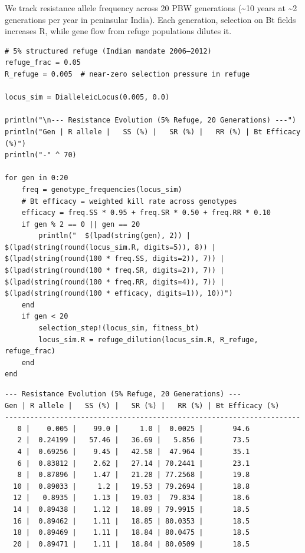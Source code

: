 \label{10169805131403377556}{}


We track resistance allele frequency across 20 PBW generations ({\textasciitilde}10 years at {\textasciitilde}2 generations per year in peninsular India). Each generation, selection on Bt fields increases R, while gene flow from refuge populations dilutes it.




\begin{verbatim}
# 5% structured refuge (Indian mandate 2006–2012)
refuge_frac = 0.05
R_refuge = 0.005  # near-zero selection pressure in refuge

locus_sim = DialleleicLocus(0.005, 0.0)

println("\n--- Resistance Evolution (5% Refuge, 20 Generations) ---")
println("Gen | R allele |   SS (%) |   SR (%) |   RR (%) | Bt Efficacy (%)")
println("-" ^ 70)

for gen in 0:20
    freq = genotype_frequencies(locus_sim)
    # Bt efficacy = weighted kill rate across genotypes
    efficacy = freq.SS * 0.95 + freq.SR * 0.50 + freq.RR * 0.10
    if gen % 2 == 0 || gen == 20
        println("  $(lpad(string(gen), 2)) | $(lpad(string(round(locus_sim.R, digits=5)), 8)) | $(lpad(string(round(100 * freq.SS, digits=2)), 7)) | $(lpad(string(round(100 * freq.SR, digits=2)), 7)) | $(lpad(string(round(100 * freq.RR, digits=4)), 7)) | $(lpad(string(round(100 * efficacy, digits=1)), 10))")
    end
    if gen < 20
        selection_step!(locus_sim, fitness_bt)
        locus_sim.R = refuge_dilution(locus_sim.R, R_refuge, refuge_frac)
    end
end
\end{verbatim}




\begin{verbatim}
--- Resistance Evolution (5% Refuge, 20 Generations) ---
Gen | R allele |   SS (%) |   SR (%) |   RR (%) | Bt Efficacy (%)
----------------------------------------------------------------------
   0 |    0.005 |    99.0 |     1.0 |  0.0025 |       94.6
   2 |  0.24199 |   57.46 |   36.69 |   5.856 |       73.5
   4 |  0.69256 |    9.45 |   42.58 |  47.964 |       35.1
   6 |  0.83812 |    2.62 |   27.14 | 70.2441 |       23.1
   8 |  0.87896 |    1.47 |   21.28 | 77.2568 |       19.8
  10 |  0.89033 |     1.2 |   19.53 | 79.2694 |       18.8
  12 |   0.8935 |    1.13 |   19.03 |  79.834 |       18.6
  14 |  0.89438 |    1.12 |   18.89 | 79.9915 |       18.5
  16 |  0.89462 |    1.11 |   18.85 | 80.0353 |       18.5
  18 |  0.89469 |    1.11 |   18.84 | 80.0475 |       18.5
  20 |  0.89471 |    1.11 |   18.84 | 80.0509 |       18.5
\end{verbatim}



